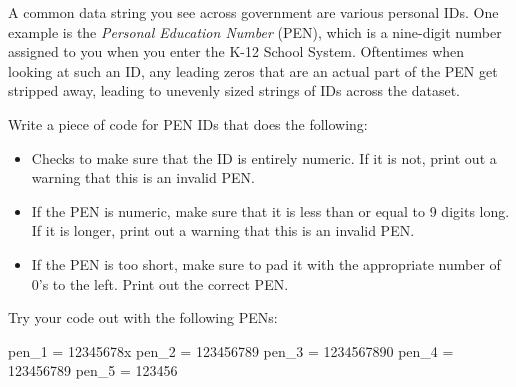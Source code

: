 \documentclass[
  letterpaper,
  DIV=11,
  numbers=noendperiod]{scrreprt}
\newenvironment{Shaded}{\begin{snugshade}}{\end{snugshade}}
\newcommand{\DecValTok}[1]{\textcolor[rgb]{0.68,0.00,0.00}{#1}}
\newcommand{\NormalTok}[1]{\textcolor[rgb]{0.00,0.23,0.31}{#1}}
\newcommand{\OperatorTok}[1]{\textcolor[rgb]{0.37,0.37,0.37}{#1}}
\newcommand{\StringTok}[1]{\textcolor[rgb]{0.13,0.47,0.30}{#1}}
\providecommand{\tightlist}{%
  \setlength{\itemsep}{0pt}\setlength{\parskip}{0pt}}\usepackage{longtable,booktabs,array}
\begin{document}
\begin{tcolorbox}[enhanced jigsaw, rightrule=.15mm, opacitybacktitle=0.6, colback=white, toprule=.15mm, colframe=quarto-callout-warning-color-frame, bottomtitle=1mm, bottomrule=.15mm, arc=.35mm, coltitle=black, breakable, title={Challenge 7}, titlerule=0mm, opacityback=0, colbacktitle=quarto-callout-warning-color!10!white, left=2mm, toptitle=1mm, leftrule=.75mm]

A common data string you see across government are various personal IDs.
One example is the \emph{Personal Education Number} (PEN), which is a
nine-digit number assigned to you when you enter the K-12 School System.
Oftentimes when looking at such an ID, any leading zeros that are an
actual part of the PEN get stripped away, leading to unevenly sized
strings of IDs across the dataset.

Write a piece of code for PEN IDs that does the following:

\begin{itemize}
\tightlist
\item
  Checks to make sure that the ID is entirely numeric. If it is not,
  print out a warning that this is an invalid PEN.
\item
  If the PEN is numeric, make sure that it is less than or equal to 9
  digits long. If it is longer, print out a warning that this is an
  invalid PEN.
\item
  If the PEN is too short, make sure to pad it with the appropriate
  number of 0's to the left. Print out the correct PEN.
\end{itemize}

Try your code out with the following PENs:

\begin{Shaded}
\begin{Highlighting}[]
\NormalTok{pen\_1 }\OperatorTok{=} \StringTok{\textquotesingle{}12345678x\textquotesingle{}}
\NormalTok{pen\_2 }\OperatorTok{=} \StringTok{\textquotesingle{}123456789\textquotesingle{}}
\NormalTok{pen\_3 }\OperatorTok{=} \StringTok{\textquotesingle{}1234567890\textquotesingle{}}
\NormalTok{pen\_4 }\OperatorTok{=} \DecValTok{123456789}
\NormalTok{pen\_5 }\OperatorTok{=} \StringTok{\textquotesingle{}123456\textquotesingle{}}
\end{Highlighting}
\end{Shaded}

\end{tcolorbox}
\end{document}
